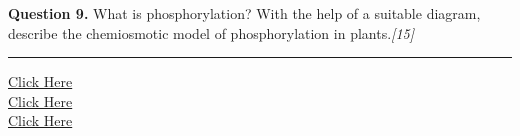\documentclass[11pt,a4paper]{article}
\newcommand{\pts}[1]{\hfill   \textit{[#1]}}
\begin{document}
\medskip


\noindent   \textbf{Question 9.} What is phosphorylation? With the help of a suitable diagram, describe the chemiosmotic model of phosphorylation in plants.\pts{15}

\vfill
\rule{\linewidth}{0.4pt}

\begin{center}\small
\href{https://bhu-exam.vercel.app/}{Click Here}\\[4pt]\href{https://me-aryan.vercel.app/}{Click Here}\\[4pt]\href{https://quashan-me.vercel.app/}{Click Here}
\end{center}
\end{document}
